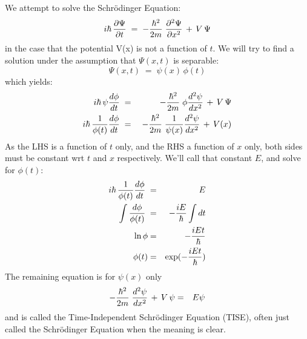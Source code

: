 \documentclass[12pt]{book}
\begin{document}
We attempt to solve the Schr\"odinger Equation:
\begin{equation}
\label{eqn:se}
i \hbar \,  \frac{\partial \Psi}{\partial t}  \; = \; - \frac{\hbar^2}{2 m} \;  \frac{\partial^2 \Psi}{\partial x^2}  \, + \, V \, \Psi
\end{equation}
in the case that the potential V(x) is not a function of $t$.  We will try to find a solution under the assumption that $\Psi(x,t)$ is separable:
\begin{equation}
\Psi(x,t) \; = \; \psi(x) \,\phi(t)
\end{equation}
which yields:
\begin{eqnarray*}
i \hbar \, \psi  \frac{d \phi}{dt}  \; &=& \; - \frac{\hbar^2}{2 m} \; \phi  \frac{d^2 \psi}{dx^2}  \, + \, V \, \Psi\\
i \hbar \, \frac{1}{\phi(t)}  \frac{d \phi}{dt}  \; &=& \; - \frac{\hbar^2}{2 m} \; \frac{1}{\psi(x)} \frac{d^2 \psi}{dx^2}  \, + \, V(x)\\
\end{eqnarray*}
As the LHS is a function of $t$ only, and the RHS a function of $x$ only, both sides must be constant wrt $t$ and $x$ respectively.  We'll call that constant $E$, and solve for $\phi(t)$:
\begin{eqnarray*}
i \hbar \, \frac{1}{\phi(t)}  \frac{d \phi}{dt}  \; &=& E\\
\int \frac{d\phi}{\phi(t)}  \; &=& -\frac{iE}{\hbar} \int dt\\
\ln \phi &=& -\frac{iEt}{\hbar}\\
\phi(t) &=& \exp(-\frac{iEt}{\hbar})\\
\end{eqnarray*}
The remaining equation is for $\psi(x)$ only
\begin{eqnarray*}
- \frac{\hbar^2}{2 m} \;  \frac{d^2 \psi}{dx^2}  \, + \, V \, \psi &=& E \psi\\
\end{eqnarray*}
and is called the Time-Independent Schr\"odinger Equation (TISE), often just called the Schr\"odinger Equation when the meaning is clear.
\end{document}
